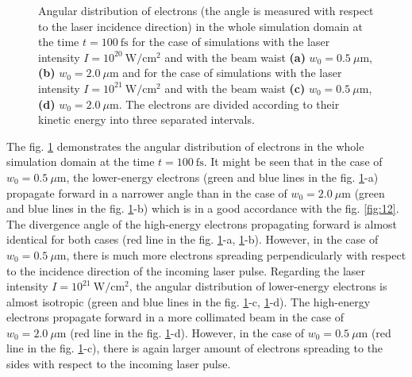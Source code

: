\begin{figure}[h!]
	\caption{Angular distribution of electrons (the angle is measured with respect to the laser incidence direction) in the whole simulation domain at the time $ t = 100 \ \mathrm{fs} $ for the case of simulations with the laser intensity $ I = 10^{20} \ \mathrm{W/cm^2} $ and with the beam waist \textbf{(a)} $ w_0 = 0.5 \ \mu\mathrm{m} $, \textbf{(b)} $ w_0 = 2.0 \ \mu\mathrm{m} $ and for the case of simulations with the laser intensity $ I = 10^{21} \ \mathrm{W/cm^2} $ and with the beam waist \textbf{(c)} $ w_0 = 0.5 \ \mu\mathrm{m} $, \textbf{(d)} $ w_0 = 2.0 \ \mu\mathrm{m} $. The electrons are divided according to their kinetic energy into three separated intervals.}
	\label{fig:13}
\end{figure}

The fig. \ref{fig:13} demonstrates the angular distribution of electrons in the whole simulation domain at the time $ t = 100 \ \mathrm{fs} $. It might be seen that in the case of $ w_0 = 0.5 \ \mu\mathrm{m} $, the lower-energy electrons (green and blue lines in the fig. \ref{fig:13}-a) propagate forward in a narrower angle than in the case of $ w_0 = 2.0 \ \mu\mathrm{m} $ (green and blue lines in the fig. \ref{fig:13}-b) which is in a good accordance with the fig. \ref{fig:12}. The divergence angle of the high-energy electrons propagating forward is almost identical for both cases (red line in the fig. \ref{fig:13}-a, \ref{fig:13}-b). However, in the case of $ w_0 = 0.5 \ \mu\mathrm{m} $, there is much more electrons spreading perpendicularly with respect to the incidence direction of the incoming laser pulse. Regarding the laser intensity $ I = 10^{21} \ \mathrm{W/cm^2} $, the angular distribution of lower-energy electrons is almost isotropic (green and blue lines in the fig. \ref{fig:13}-c, \ref{fig:13}-d). The high-energy electrons propagate forward in a more collimated beam in the case of $ w_0 = 2.0 \ \mu\mathrm{m} $ (red line in the fig. \ref{fig:13}-d). However, in the case of $ w_0 = 0.5 \ \mu\mathrm{m} $ (red line in the fig. \ref{fig:13}-c), there is again larger amount of electrons spreading to the sides with respect to the incoming laser pulse.

